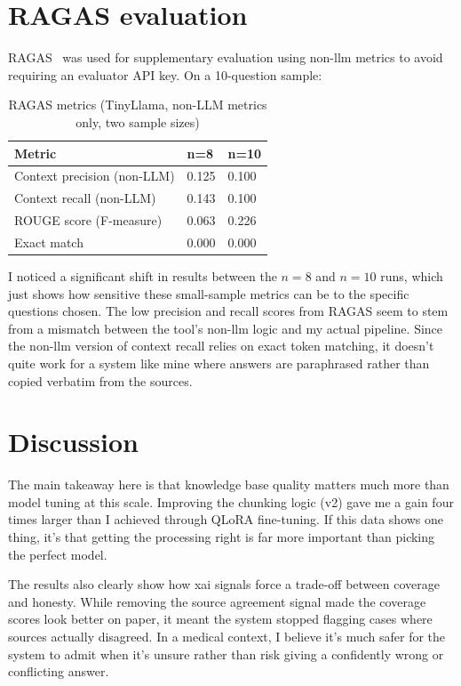 \section{RAGAS evaluation}

RAGAS~\cite{es2023ragas} was used for supplementary evaluation using non-\ac{llm} metrics to avoid requiring an evaluator API key. On a 10-question sample:

\begin{table}[htbp]
\centering
\caption{RAGAS metrics (TinyLlama, non-LLM metrics only, two sample sizes)}
\renewcommand{\arraystretch}{1.3}
\begin{tabular}{|l|l|l|}
\hline
\textbf{Metric} & \textbf{n=8} & \textbf{n=10} \\
\hline
Context precision (non-LLM) & 0.125 & 0.100 \\
Context recall (non-LLM) & 0.143 & 0.100 \\
ROUGE score (F-measure) & 0.063 & 0.226 \\
Exact match & 0.000 & 0.000 \\
\hline
\end{tabular}
\end{table}

I noticed a significant shift in results between the $n=8$ and $n=10$ runs, which just shows how sensitive these small-sample metrics can be to the specific questions chosen. The low precision and recall scores from RAGAS seem to stem from a mismatch between the tool's non-\ac{llm} logic and my actual pipeline. Since the non-\ac{llm} version of context recall relies on exact token matching, it doesn't quite work for a system like mine where answers are paraphrased rather than copied verbatim from the sources.

\section{Discussion}

The main takeaway here is that knowledge base quality matters much more than model tuning at this scale. Improving the chunking logic (v2) gave me a gain four times larger than I achieved through QLoRA fine-tuning. If this data shows one thing, it's that getting the processing right is far more important than picking the perfect model.

The results also clearly show how \ac{xai} signals force a trade-off between coverage and honesty. While removing the source agreement signal made the coverage scores look better on paper, it meant the system stopped flagging cases where sources actually disagreed. In a medical context, I believe it's much safer for the system to admit when it's unsure rather than risk giving a confidently wrong or conflicting answer.

